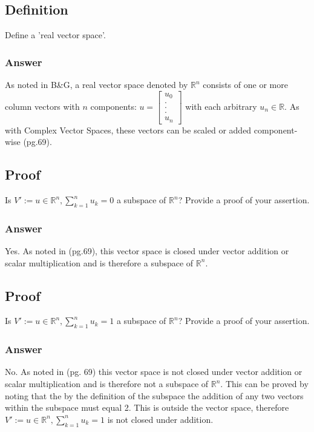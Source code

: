 \documentclass{article}
\begin{document}
		\subsection{Definition}
		Define a 'real vector space'.
		
		\subsubsection{Answer}
		As noted in B\&G, a real vector space denoted by $\mathbb{R}^{n}$ consists of one or more column vectors with $n$ components: $u=\begin{bmatrix}
		u_{0}\\
		.\\
		.\\
		.\\
		u_{n}
		\end{bmatrix}$ with each arbitrary $u_{n}\in\mathbb{R}$.  
		As with Complex Vector Spaces, these vectors can be scaled or added component-wise \cite{BG}(pg.69).  
		
		
		\subsection{Proof}
		Is $V':={u\in\mathbb{R}^{n},\sum_{k=1}^{n}u_{k}=0}$ a subspace of $\mathbb{R}^{n}$?  Provide a proof of your assertion.	
		
		\subsubsection{Answer}
		
		Yes.  As noted in \cite{BG}(pg.69), this vector space is closed under vector addition or scalar multiplication and is therefore a subspace of $\mathbb{R}^{n}$.
		
		\subsection{Proof}
		Is $V':={u\in\mathbb{R}^{n},\sum_{k=1}^{n}u_{k}=1}$ a subspace of $\mathbb{R}^{n}$?  Provide a proof of your assertion.	
			
		\subsubsection{Answer}
		No.  As noted in \cite{BG}(pg. 69) this vector space is not closed under vector addition or scalar multiplication and is therefore not a subspace of $\mathbb{R}^{n}$.  This can be proved by noting that the by the definition of the subspace the addition of any two vectors within the subspace must equal 2.  This is outside the vector space, therefore  $V':={u\in\mathbb{R}^{n},\sum_{k=1}^{n}u_{k}=1}$ is not closed under addition.
		
\end{document}
